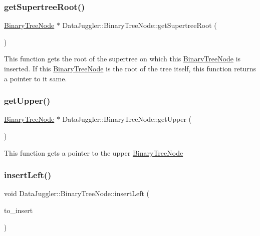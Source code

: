 \subsubsection{\texorpdfstring{get\+Supertree\+Root()}{getSupertreeRoot()}}
{\footnotesize\ttfamily \hyperlink{classDataJuggler_1_1BinaryTreeNode}{Binary\+Tree\+Node} $\ast$ Data\+Juggler\+::\+Binary\+Tree\+Node\+::get\+Supertree\+Root (\begin{DoxyParamCaption}{ }\end{DoxyParamCaption})}

This function gets the root of the supertree on which this \hyperlink{classDataJuggler_1_1BinaryTreeNode}{Binary\+Tree\+Node} is inserted. If this \hyperlink{classDataJuggler_1_1BinaryTreeNode}{Binary\+Tree\+Node} is the root of the tree itself, this function returns a pointer to it same. \mbox{\label{classDataJuggler_1_1BinaryTreeNode_a07f3536b32e66d434b426f2d4903710a}} 
\subsubsection{\texorpdfstring{get\+Upper()}{getUpper()}}
{\footnotesize\ttfamily \hyperlink{classDataJuggler_1_1BinaryTreeNode}{Binary\+Tree\+Node} $\ast$ Data\+Juggler\+::\+Binary\+Tree\+Node\+::get\+Upper (\begin{DoxyParamCaption}{ }\end{DoxyParamCaption})}

This function gets a pointer to the upper \hyperlink{classDataJuggler_1_1BinaryTreeNode}{Binary\+Tree\+Node} \mbox{\label{classDataJuggler_1_1BinaryTreeNode_a65f216d77e7953f02dfa4bc293fd8993}} 
\subsubsection{\texorpdfstring{insert\+Left()}{insertLeft()}}
{\footnotesize\ttfamily void Data\+Juggler\+::\+Binary\+Tree\+Node\+::insert\+Left (\begin{DoxyParamCaption}\item[{\hyperlink{classDataJuggler_1_1BinaryTreeNode}{Binary\+Tree\+Node} $\ast$}]{to\+\_\+insert }\end{DoxyParamCaption})}

